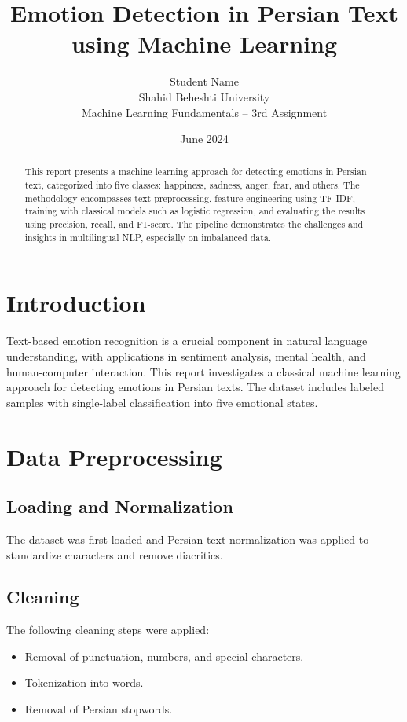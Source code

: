 \documentclass[12pt]{article}
\title{Emotion Detection in Persian Text using Machine Learning}
\author{Student Name \\ Shahid Beheshti University \\ Machine Learning Fundamentals – 3rd Assignment}
\date{June 2024}
\begin{document}
\maketitle

\begin{abstract}
This report presents a machine learning approach for detecting emotions in Persian text, categorized into five classes: happiness, sadness, anger, fear, and others. The methodology encompasses text preprocessing, feature engineering using TF-IDF, training with classical models such as logistic regression, and evaluating the results using precision, recall, and F1-score. The pipeline demonstrates the challenges and insights in multilingual NLP, especially on imbalanced data.
\end{abstract}

\section{Introduction}
Text-based emotion recognition is a crucial component in natural language understanding, with applications in sentiment analysis, mental health, and human-computer interaction. This report investigates a classical machine learning approach for detecting emotions in Persian texts. The dataset includes labeled samples with single-label classification into five emotional states.

\section{Data Preprocessing}
\subsection{Loading and Normalization}
The dataset was first loaded and Persian text normalization was applied to standardize characters and remove diacritics.

\subsection{Cleaning}
The following cleaning steps were applied:
\begin{itemize}
    \item Removal of punctuation, numbers, and special characters.
    \item Tokenization into words.
    \item Removal of Persian stopwords.
\end{itemize}
\end{document}
